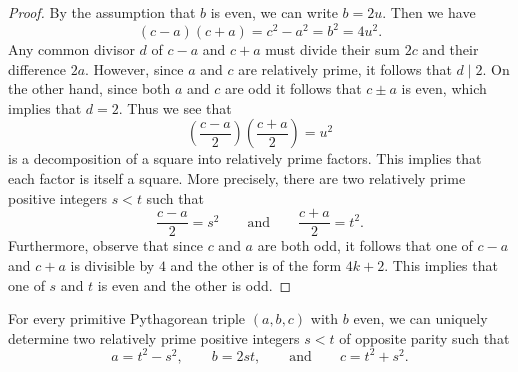 \begin{proof}
  By the assumption that $b$ is even, we can write $b=2u$. Then we have
  \begin{equation*}
    (c-a)(c+a) = c^2-a^2 = b^2 = 4u^2.
  \end{equation*}
  Any common divisor $d$ of $c-a$ and $c+a$ must divide their sum $2c$ and their difference $2a$. However, since $a$ and $c$ are relatively prime, it follows that $d\mid 2$. On the other hand, since both $a$ and $c$ are odd it follows that $c\pm a$ is even, which implies that $d=2$. Thus we see that
  \begin{equation*}
    \left(\frac{c-a}{2}\right)\left(\frac{c+a}{2}\right)=u^2
  \end{equation*}
  is a decomposition of a square into relatively prime factors. This implies that each factor is itself a square. More precisely, there are two relatively prime positive integers $s<t$ such that
  \begin{equation*}
    \frac{c-a}{2}=s^2\qquad\text{and}\qquad\frac{c+a}{2}=t^2.
  \end{equation*}
  Furthermore, observe that since $c$ and $a$ are both odd, it follows that one of $c-a$ and $c+a$ is divisible by $4$ and the other is of the form $4k+2$. This implies that one of $s$ and $t$ is even and the other is odd.
\end{proof}

\begin{theorem}\label{theorem:euclids-parametrization}
  For every primitive Pythagorean triple $(a,b,c)$ with $b$ even, we can uniquely determine two relatively prime positive integers $s<t$ of opposite parity such that
  \begin{equation*}
    a=t^2-s^2,\qquad b=2st,\qquad\text{and}\qquad c=t^2+s^2.
  \end{equation*}
\end{theorem}


